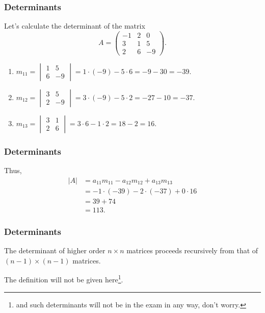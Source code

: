 \begin{frame}
  \frametitle{Determinants}
  \begin{presentation_example}
    Let's calculate the determinant of the matrix
    \begin{equation*}
      A =
      \begin{pmatrix}
        -1 & 2 & 0\\
        3 & 1 & 5\\
        2 & 6 & -9
      \end{pmatrix}.
    \end{equation*}
    \begin{enumerate}
      \item $m_{11} = \begin{vmatrix} 1 & 5 \\ 6 & -9 \end{vmatrix} = 1\cdot(-9)-5\cdot6 = -9 - 30 = -39$.
      \item $m_{12} = \begin{vmatrix} 3 & 5 \\ 2 & -9 \end{vmatrix} = 3\cdot(-9)-5\cdot2 = -27 - 10 = -37$.
      \item $m_{13} = \begin{vmatrix} 3 & 1 \\ 2 & 6 \end{vmatrix}  = 3\cdot6 - 1\cdot2  = 18 - 2 = 16$.
    \end{enumerate}
  \end{presentation_example}
\end{frame}

\begin{frame}
  \frametitle{Determinants}
  \begin{presentation_example}
    Thus,
    \begin{align*}
      |A| &= a_{11}m_{11} - a_{12}m_{12} + a_{13}m_{13}\\
      &= -1\cdot(-39) -2\cdot(-37) + 0\cdot16\\
      &= 39 + 74\\
      &= 113.
    \end{align*}
  \end{presentation_example}
\end{frame}

\begin{frame}
  \frametitle{Determinants}
  The determinant of higher order $n\times n$ matrices proceeds recursively from that of $\left( n-1 \right)\times\left( n-1 \right)$ matrices.

  The definition will not be given here\footnote{and such determinants will not be in the exam in any way, don't worry.}.
\end{frame}

